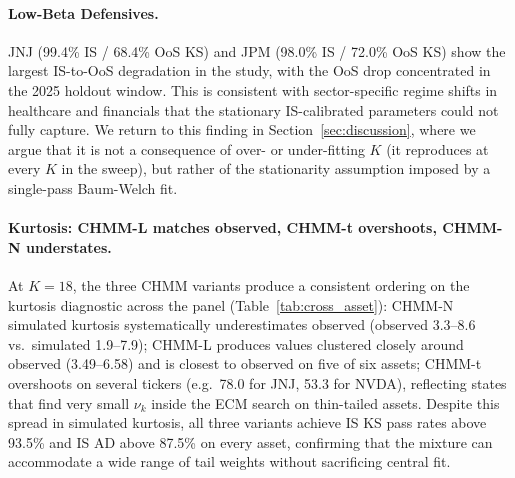 \paragraph{Low-Beta Defensives.}
JNJ (99.4\% IS / 68.4\% OoS KS) and JPM (98.0\% IS / 72.0\% OoS KS) show the largest IS-to-OoS degradation in the study, with the OoS drop concentrated in the 2025 holdout window.
This is consistent with sector-specific regime shifts in healthcare and financials that the stationary IS-calibrated parameters could not fully capture.
We return to this finding in Section~\ref{sec:discussion}, where we argue that it is not a consequence of over- or under-fitting $K$ (it reproduces at every $K$ in the sweep), but rather of the stationarity assumption imposed by a single-pass Baum-Welch fit.

\paragraph{Kurtosis: CHMM-L matches observed, CHMM-t overshoots, CHMM-N understates.}
At $K = 18$, the three CHMM variants produce a consistent ordering on the kurtosis diagnostic across the panel (Table~\ref{tab:cross_asset}): CHMM-N simulated kurtosis systematically underestimates observed (observed 3.3--8.6 vs.\ simulated 1.9--7.9); CHMM-L produces values clustered closely around observed (3.49--6.58) and is closest to observed on five of six assets; CHMM-t overshoots on several tickers (e.g.\ 78.0 for JNJ, 53.3 for NVDA), reflecting states that find very small $\nu_k$ inside the ECM search on thin-tailed assets.
Despite this spread in simulated kurtosis, all three variants achieve IS KS pass rates above 93.5\% and IS AD above 87.5\% on every asset, confirming that the mixture can accommodate a wide range of tail weights without sacrificing central fit.

